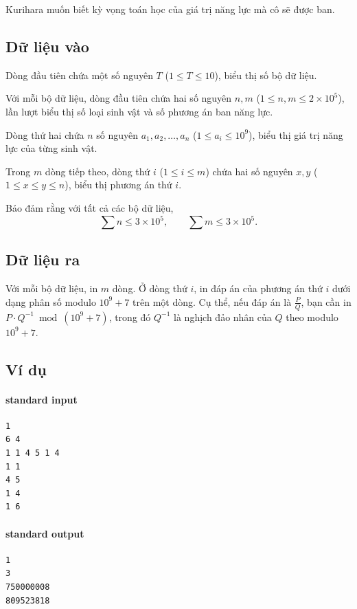 \documentclass[11pt]{article}
\begin{document}
Kurihara muốn biết kỳ vọng toán học của giá trị năng lực mà cô sẽ được ban.

\subsection*{Dữ liệu vào}

Dòng đầu tiên chứa một số nguyên \(T\) (\(1\le T\le 10\)), biểu thị số bộ dữ
liệu.

Với mỗi bộ dữ liệu, dòng đầu tiên chứa hai số nguyên \(n,m\)
(\(1\le n,m\le 2\times 10^5\)), lần lượt biểu thị số loại sinh vật và số
phương án ban năng lực.

Dòng thứ hai chứa \(n\) số nguyên \(a_1,a_2,\ldots,a_n\)
(\(1\le a_i\le 10^9\)), biểu thị giá trị năng lực của từng sinh vật.

Trong \(m\) dòng tiếp theo, dòng thứ \(i\) (\(1\le i\le m\)) chứa hai số
nguyên \(x,y\) (\(1\le x\le y\le n\)), biểu thị phương án thứ \(i\).

Bảo đảm rằng với tất cả các bộ dữ liệu,
\[
  \sum n\le 3\times 10^5,\qquad
  \sum m\le 3\times 10^5.
\]

\subsection*{Dữ liệu ra}

Với mỗi bộ dữ liệu, in \(m\) dòng. Ở dòng thứ \(i\), in đáp án của phương án
thứ \(i\) dưới dạng phân số modulo \(10^9+7\) trên một dòng. Cụ thể, nếu đáp
án là \(\frac{P}{Q}\), bạn cần in \(P\cdot Q^{-1}\bmod (10^9+7)\), trong đó
\(Q^{-1}\) là nghịch đảo nhân của \(Q\) theo modulo \(10^9+7\).

\subsection*{Ví dụ}

\paragraph{standard input}
\begin{verbatim}
1
6 4
1 1 4 5 1 4
1 1
4 5
1 4
1 6
\end{verbatim}

\paragraph{standard output}
\begin{verbatim}
1
3
750000008
809523818
\end{verbatim}
\end{document}
